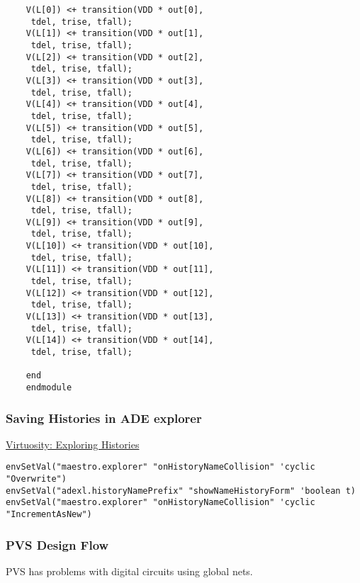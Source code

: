 \begin{file}
	\begin{lstlisting}
	V(L[0]) <+ transition(VDD * out[0],
	 tdel, trise, tfall);
	V(L[1]) <+ transition(VDD * out[1],
	 tdel, trise, tfall);
	V(L[2]) <+ transition(VDD * out[2],
	 tdel, trise, tfall);
	V(L[3]) <+ transition(VDD * out[3],
	 tdel, trise, tfall);
	V(L[4]) <+ transition(VDD * out[4],
	 tdel, trise, tfall);
	V(L[5]) <+ transition(VDD * out[5],
	 tdel, trise, tfall);
	V(L[6]) <+ transition(VDD * out[6],
	 tdel, trise, tfall);
	V(L[7]) <+ transition(VDD * out[7],
	 tdel, trise, tfall);
	V(L[8]) <+ transition(VDD * out[8],
	 tdel, trise, tfall);
	V(L[9]) <+ transition(VDD * out[9],
	 tdel, trise, tfall);
	V(L[10]) <+ transition(VDD * out[10],
	 tdel, trise, tfall);
	V(L[11]) <+ transition(VDD * out[11],
	 tdel, trise, tfall);
	V(L[12]) <+ transition(VDD * out[12],
	 tdel, trise, tfall);
	V(L[13]) <+ transition(VDD * out[13],
	 tdel, trise, tfall);
	V(L[14]) <+ transition(VDD * out[14],
	 tdel, trise, tfall);

	end  
	endmodule
	\end{lstlisting}
\end{file}

\newpage

\subsubsection*{Saving Histories in ADE explorer}

\href{https://community.cadence.com/cadence_blogs_8/b/cic/posts/virtuosity-exploring-histories}{Virtuosity: Exploring Histories}
\begin{verbatim}
envSetVal("maestro.explorer" "onHistoryNameCollision" 'cyclic "Overwrite")
envSetVal("adexl.historyNamePrefix" "showNameHistoryForm" 'boolean t)
envSetVal("maestro.explorer" "onHistoryNameCollision" 'cyclic "IncrementAsNew")
\end{verbatim}


\subsubsection*{PVS Design Flow}

PVS has problems with digital circuits using global nets.

